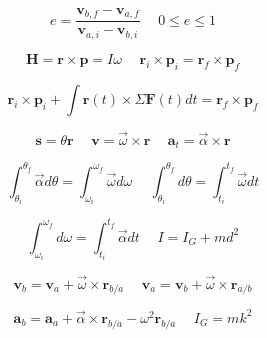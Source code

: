 \documentclass[twocolumn, 12pt]{article}
\begin{document}
\begin{equation*}
    e=\frac{\textbf{v}_{b,f}-\textbf{v}_{a,f}}{\textbf{v}_{a,i}-\textbf{v}_{b,i}}  \hspace{15pt}  0 \leq e\leq 1
\end{equation*}

\begin{equation*}
    \textbf{H}=\textbf{r} \times \textbf{p} = I\omega \hspace{15pt} \textbf{r}_i \times \textbf{p}_i = \textbf{r}_f \times \textbf{p}_f
\end{equation*}

\begin{equation*}
    \textbf{r}_i \times \textbf{p}_i + \int \textbf{r}(t) \times \Sigma \textbf{F}(t)dt = \textbf{r}_f \times \textbf{p}_f
\end{equation*}

\begin{equation*}
    \textbf{s}=\theta \textbf{r} \hspace{15pt} \textbf{v}= \Vec{\omega} \times \textbf{r} \hspace{15pt} \textbf{a}_t = \Vec{\alpha} \times \textbf{r}
\end{equation*}

\begin{equation*}
    \int_{\theta_i}^{\theta_f}   \Vec{\alpha}d\theta =\int_{\omega_i}^{\omega_f} \Vec{\omega}d\omega \hspace{15pt} \int_{\theta_i}^{\theta_f} d\theta = \int_{t_i}^{t_f}\vec{\omega} dt
\end{equation*}

\begin{equation*}
    \int_{\omega_i}^{\omega_f}d\omega = \int_{t_i}^{t_f}\Vec{\alpha}dt \hspace{15pt} I=I_G+md^2
\end{equation*}

\begin{equation*}
    \textbf{v}_b = \textbf{v}_a + \Vec{\omega} \times \textbf{r}_{b/a} \hspace{15pt} \textbf{v}_a = \textbf{v}_b +\Vec{\omega} \times \textbf{r}_{a/b} 
\end{equation*}

\begin{equation*}
    \textbf{a}_b = \textbf{a}_a + \Vec{\alpha}\times\textbf{r}_{b/a} -\omega^2\textbf{r}_{b/a} \hspace{15pt}  I_G = mk^2
\end{equation*}
\end{document}
